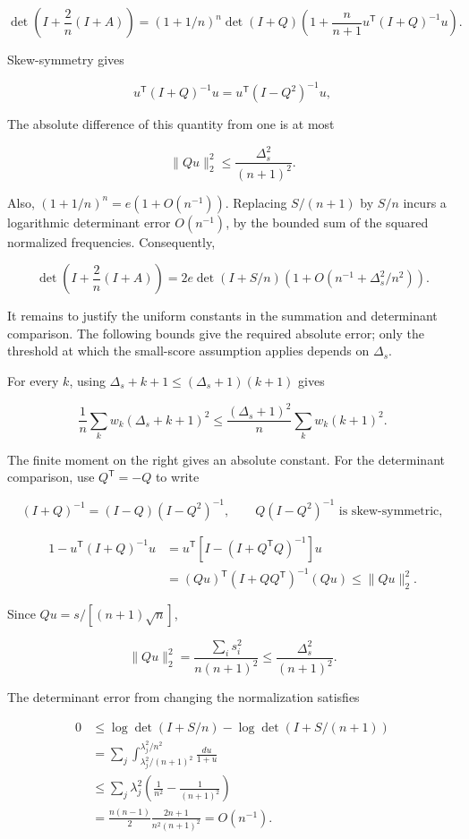 \documentclass[11pt,a4paper]{article}
\begin{document}
\[
\det\left(I+\frac2n(I+A)\right)
=(1+1/n)^n\det(I+Q)
\left(1+\frac n{n+1}u^{\mathsf T}(I+Q)^{-1}u\right).
\]

Skew-symmetry gives

\[
u^{\mathsf T}(I+Q)^{-1}u=u^{\mathsf T}(I-Q^2)^{-1}u,
\]

The absolute difference of this quantity from one is at most

\[
\|Qu\|_2^2\le\frac{\Delta_s^2}{(n+1)^2}.
\]

Also, \((1+1/n)^n=e(1+O(n^{-1}))\). Replacing \(S/(n+1)\) by \(S/n\) incurs a logarithmic determinant error \(O(n^{-1})\), by the bounded sum of the squared normalized frequencies. Consequently,

\[
\det\left(I+\frac2n(I+A)\right)
=2e\det(I+S/n)\left(1+O(n^{-1}+\Delta_s^2/n^2)\right).
\]

It remains to justify the uniform constants in the summation and determinant comparison. The following bounds give the required absolute error; only the threshold at which the small-score assumption applies depends on \(\Delta_s\).

For every \(k\), using \(\Delta_s+k+1\le(\Delta_s+1)(k+1)\) gives

\[
\frac1n\sum_kw_k(\Delta_s+k+1)^2
\le\frac{(\Delta_s+1)^2}{n}\sum_kw_k(k+1)^2.
\]

The finite moment on the right gives an absolute constant. For the determinant comparison, use \(Q^{\mathsf T}=-Q\) to write

\[
(I+Q)^{-1}=(I-Q)(I-Q^2)^{-1},\qquad
Q(I-Q^2)^{-1}\text{ is skew-symmetric},
\]

\[
\begin{aligned}
1-u^{\mathsf T}(I+Q)^{-1}u
&=u^{\mathsf T}[I-(I+Q^{\mathsf T}Q)^{-1}]u\\
&=(Qu)^{\mathsf T}(I+QQ^{\mathsf T})^{-1}(Qu)
\le\|Qu\|_2^2.
\end{aligned}
\]

Since \(Qu=s/[(n+1)\sqrt n]\),

\[
\|Qu\|_2^2=\frac{\sum_i s_i^2}{n(n+1)^2}\le\frac{\Delta_s^2}{(n+1)^2}.
\]

The determinant error from changing the normalization satisfies

\[
\begin{aligned}
0&\le\log\det(I+S/n)-\log\det(I+S/(n+1))\\
&=\sum_j\int_{\lambda_j^2/(n+1)^2}^{\lambda_j^2/n^2}\frac{du}{1+u}\\
&\le\sum_j\lambda_j^2\left(\frac1{n^2}-\frac1{(n+1)^2}\right)\\
&=\frac{n(n-1)}2\frac{2n+1}{n^2(n+1)^2}=O(n^{-1}).
\end{aligned}
\]
\end{document}
